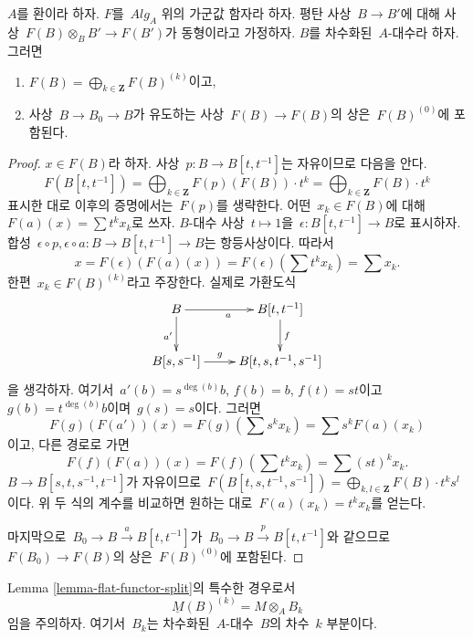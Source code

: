 \begin{lemma}
\label{lemma-flat-functor-split}
$A$를 환이라 하자.
$F$를\  $\textit{Alg}_A$ 위의 가군값 함자라 하자.
평탄 사상\  $B \to B'$에 대해 사상\ 
$F(B) \otimes_B B' \to F(B')$가 동형이라고 가정하자.
$B$를 차수화된\  $A$-대수라 하자. 그러면
\begin{enumerate}
\item $F(B) = \bigoplus_{k \in \mathbf{Z}} F(B)^{(k)}$이고,
\item 사상\  $B \to B_0 \to B$가 유도하는 사상\  $F(B) \to F(B)$의
상은\  $F(B)^{(0)}$에 포함된다.
\end{enumerate}
\end{lemma}

\begin{proof}
$x \in F(B)$라 하자. 사상\  $p : B \to B[t, t^{-1}]$는 자유이므로
다음을 안다.
$$
F(B[t, t^{-1}]) =
\bigoplus\nolimits_{k \in \mathbf{Z}} F(p)(F(B)) \cdot t^k =
\bigoplus\nolimits_{k \in \mathbf{Z}} F(B) \cdot t^k
$$
표시한 대로 이후의 증명에서는\  $F(p)$를 생략한다.
어떤\  $x_k \in F(B)$에 대해\  $F(a)(x) = \sum t^k x_k$로 쓰자.
$B$-대수 사상\  $t \mapsto 1$을\ 
$\epsilon : B[t, t^{-1}] \to B$로 표시하자. 합성\ 
$\epsilon \circ p, \epsilon \circ a : B \to B[t, t^{-1}] \to B$는
항등사상이다. 따라서
$$
x = F(\epsilon)(F(a)(x)) = F(\epsilon)(\sum t^k x_k) = \sum x_k.
$$
한편\  $x_k \in F(B)^{(k)}$라고 주장한다. 실제로 가환도식
$$
\xymatrix{
B \ar[r]_a \ar[d]_{a'} &
B[t, t^{-1}] \ar[d]^f \\
B[s, s^{-1}] \ar[r]^-g &
B[t, s, t^{-1}, s^{-1}]
}
$$
을 생각하자. 여기서\  $a'(b) = s^{\deg(b)}b$, $f(b) = b$, $f(t) = st$이고\ 
$g(b) = t^{\deg(b)}b$이며\  $g(s) = s$이다. 그러면
$$
F(g)(F(a'))(x) = F(g)(\sum s^k x_k) =
\sum s^k F(a)(x_k)
$$
이고, 다른 경로로 가면
$$
F(f)(F(a))(x) = F(f)(\sum t^k x_k) = \sum (st)^k x_k.
$$
$B \to B[s, t, s^{-1}, t^{-1}]$가 자유이므로\ 
$F(B[t, s, t^{-1}, s^{-1}]) =
\bigoplus_{k, l \in \mathbf{Z}} F(B) \cdot t^ks^l$이다. 위 두 식의
계수를 비교하면 원하는 대로\  $F(a)(x_k) = t^k x_k$를 얻는다.

\medskip\noindent
마지막으로\  $B_0 \to B \xrightarrow{a} B[t, t^{-1}]$가\ 
$B_0 \to B \xrightarrow{p} B[t, t^{-1}]$와 같으므로\ 
$F(B_0) \to F(B)$의 상은\  $F(B)^{(0)}$에 포함된다.
\end{proof}

\noindent
Lemma \ref{lemma-flat-functor-split}의 특수한 경우로서
$$
\underline{M}(B)^{(k)} = M \otimes_A B_k
$$
임을 주의하자. 여기서\  $B_k$는 차수화된\  $A$-대수\  $B$의 차수\  $k$
부분이다.

